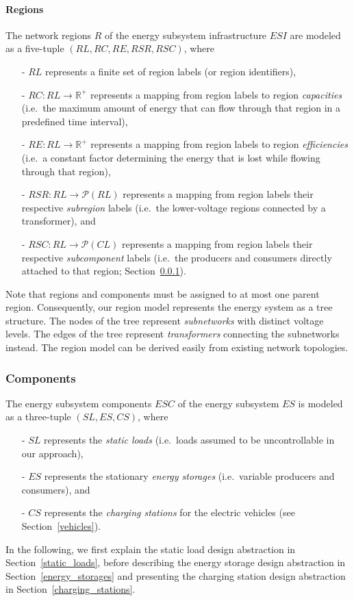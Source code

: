 \paragraph{Regions}
\label{regions}

The network regions $R$ of the energy subsystem infrastructure $ESI$ are modeled as a five-tuple $(RL, RC, RE, RSR, RSC)$, where
\begin{itemize}
	\item[-] $RL$ represents a finite set of region labels (or region identifiers),
	\item[-] $RC: RL \rightarrow \mathbb{R}^+$ represents a mapping from region labels to region \textit{capacities} (i.e.\ the maximum amount of energy that can flow through that region in a predefined time interval),
	\item[-] $RE: RL \rightarrow \mathbb{R}^+$ represents a mapping from region labels to region \textit{efficiencies} (i.e.\ a constant factor determining the energy that is lost while flowing through that region),
	\item[-] $RSR: RL \rightarrow \mathcal{P}(RL)$ represents a mapping from region labels their respective \textit{subregion} labels (i.e.\ the lower-voltage regions connected by a transformer), and
	\item[-] $RSC: RL \rightarrow \mathcal{P}(CL)$ represents a mapping from region labels their respective \textit{subcomponent} labels (i.e.\ the producers and consumers directly attached to that region; Section~\ref{components}).
\end{itemize}
Note that regions and components must be assigned to at most one parent region. Consequently, our region model represents the energy system as a tree structure. The nodes of the tree represent \textit{subnetworks} with distinct voltage levels. The edges of the tree represent \textit{transformers} connecting the subnetworks instead. The region model can be derived easily from existing network topologies.

\subsubsection{Components}
\label{components}

The energy subsystem components $ESC$ of the energy subsystem $ES$ is modeled as a three-tuple $(SL, ES, CS)$, where
\begin{itemize}
	\item[-] $SL$ represents the \textit{static loads} (i.e.\ loads assumed to be uncontrollable in our approach),
	\item[-] $ES$ represents the stationary \textit{energy storages} (i.e.\ variable producers and consumers), and
	\item[-] $CS$ represents the \textit{charging stations} for the electric vehicles (see Section~\ref{vehicles}).
\end{itemize}
In the following, we first explain the static load design abstraction in Section~\ref{static_loads}, before describing the energy storage design abstraction in Section~\ref{energy_storages} and presenting the charging station design abstraction in Section~\ref{charging_stations}.

